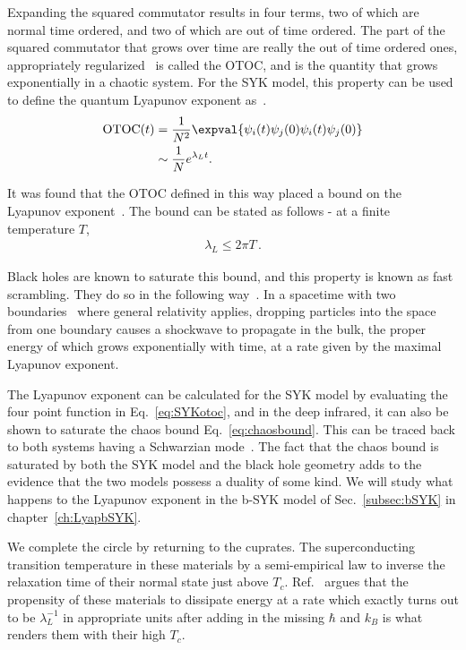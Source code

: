\par
Expanding the squared commutator results in four terms, two of which are normal time ordered, and two of which are out of time ordered. The part of the squared commutator that grows over time are really the out of time ordered ones, appropriately regularized~\cite{romero2019regularization} is called the OTOC, and is the quantity that grows exponentially in a chaotic system. For the SYK model, this property can be used to define the quantum Lyapunov exponent as~\cite{maldacena_comments_2016}.
\begin{align}
    \mathrm{OTOC}(t) &= \frac{1}{N^2}\expval{\psi_i(t)\psi_j(0)\psi_i(t)\psi_j(0)} \nonumber \\
    &\sim \frac{1}{N} e^{\lambda_L t}. 
    \label{eq:SYKotoc}
\end{align}

\par
It was found that the OTOC defined in this way placed a bound on the Lyapunov exponent~\cite{maldacena_bound_2016}. The bound can be stated as follows - at a finite temperature $T$,
\begin{align}
    \lambda_L \leq 2\pi T \,.
    \label{eq:chaosbound}
\end{align}

\par
Black holes are known to saturate this bound, and this property is known as fast scrambling. They do so in the following way~\cite{shenker2014black,shenker2015stringy}. In a spacetime with two boundaries~\cite{maldacena2003eternal} where general relativity applies, dropping particles into the space from one boundary causes a shockwave to propagate in the bulk, the proper energy of which grows exponentially with time, at a rate given by the maximal Lyapunov exponent.  
\par
The Lyapunov exponent can be calculated for the SYK model by evaluating the four point function in Eq.~\eqref{eq:SYKotoc}, and in the deep infrared, it can also be shown to saturate the chaos bound Eq.~\ref{eq:chaosbound}. This can be traced back to both systems having a Schwarzian mode~\cite{maldacena_comments_2016}.
The fact that the chaos bound is saturated by both the SYK model and the black hole geometry adds to the evidence that the two models possess a duality of some kind. We will study what happens to the Lyapunov exponent in the b-SYK model of Sec.~\ref{subsec:bSYK} in chapter~\ref{ch:LyapbSYK}. 

We complete the circle by returning to the cuprates. The superconducting transition temperature in these materials by a semi-empirical law to inverse the relaxation time of their normal state just above $T_c$. Ref.~\cite{zaanen2004temperature} argues that the propensity of these materials to dissipate energy at a rate which exactly turns out to be $\lambda_L^{-1}$ in appropriate units after adding in the missing $\hbar$ and $k_B$ is what renders them with their high $T_c$.

